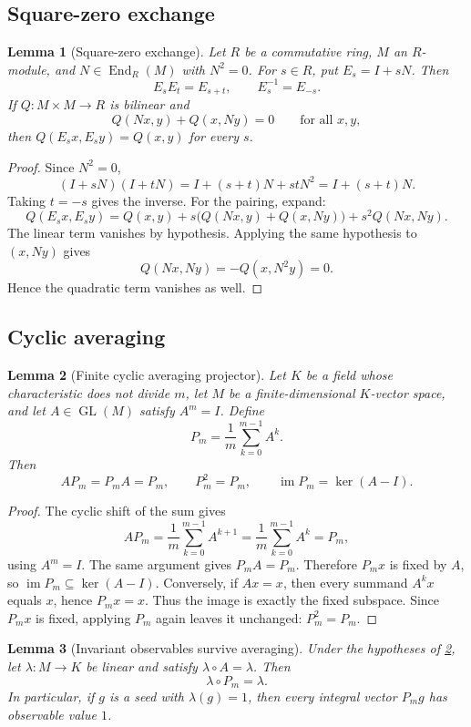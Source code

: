 \documentclass[11pt,reqno]{amsart}
\numberwithin{equation}{section}
\newcommand{\im}{\operatorname{im}}
\newtheorem{lemma}[lemma]{Lemma}
\theoremstyle{definition}
\begin{document}
\subsection{Square-zero exchange}

\begin{lemma}[Square-zero exchange]\label{lem:square-zero-exchange}
Let $R$ be a commutative ring, $M$ an $R$-module, and $N\in\operatorname{End}_R(M)$ with $N^2=0$. For $s\in R$, put $E_s=I+sN$. Then
\[
E_sE_t=E_{s+t},
\qquad
E_s^{-1}=E_{-s}.
\]
If $Q:M\times M\to R$ is bilinear and
\[
Q(Nx,y)+Q(x,Ny)=0
\qquad\text{for all }x,y,
\]
then $Q(E_sx,E_sy)=Q(x,y)$ for every $s$.
\end{lemma}

\begin{proof}
Since $N^2=0$,
\[
(I+sN)(I+tN)=I+(s+t)N+stN^2=I+(s+t)N.
\]
Taking $t=-s$ gives the inverse. For the pairing, expand:
\[
Q(E_sx,E_sy)=Q(x,y)+s\bigl(Q(Nx,y)+Q(x,Ny)\bigr)+s^2Q(Nx,Ny).
\]
The linear term vanishes by hypothesis. Applying the same hypothesis to $(x,Ny)$ gives
\[
Q(Nx,Ny)=-Q(x,N^2y)=0.
\]
Hence the quadratic term vanishes as well.
\end{proof}

\subsection{Cyclic averaging}

\begin{lemma}[Finite cyclic averaging projector]\label{lem:cyclic-projector}
Let $K$ be a field whose characteristic does not divide $m$, let $M$ be a finite-dimensional $K$-vector space, and let $A\in\operatorname{GL}(M)$ satisfy $A^m=I$. Define
\[
P_m=\frac1m\sum_{k=0}^{m-1}A^k.
\]
Then
\[
AP_m=P_mA=P_m,
\qquad
P_m^2=P_m,
\qquad
\im P_m=\ker(A-I).
\]
\end{lemma}

\begin{proof}
The cyclic shift of the sum gives
\[
AP_m=\frac1m\sum_{k=0}^{m-1}A^{k+1}
=\frac1m\sum_{k=0}^{m-1}A^k=P_m,
\]
using $A^m=I$. The same argument gives $P_mA=P_m$. Therefore $P_mx$ is fixed by $A$, so $\im P_m\subseteq\ker(A-I)$. Conversely, if $Ax=x$, then every summand $A^kx$ equals $x$, hence $P_mx=x$. Thus the image is exactly the fixed subspace. Since $P_mx$ is fixed, applying $P_m$ again leaves it unchanged: $P_m^2=P_m$.
\end{proof}

\begin{lemma}[Invariant observables survive averaging]\label{lem:observable}
Under the hypotheses of \cref{lem:cyclic-projector}, let $\lambda:M\to K$ be linear and satisfy $\lambda\circ A=\lambda$. Then
\[
\lambda\circ P_m=\lambda.
\]
In particular, if $g$ is a seed with $\lambda(g)=1$, then every integral vector $P_mg$ has observable value $1$.
\end{lemma}
\end{document}
